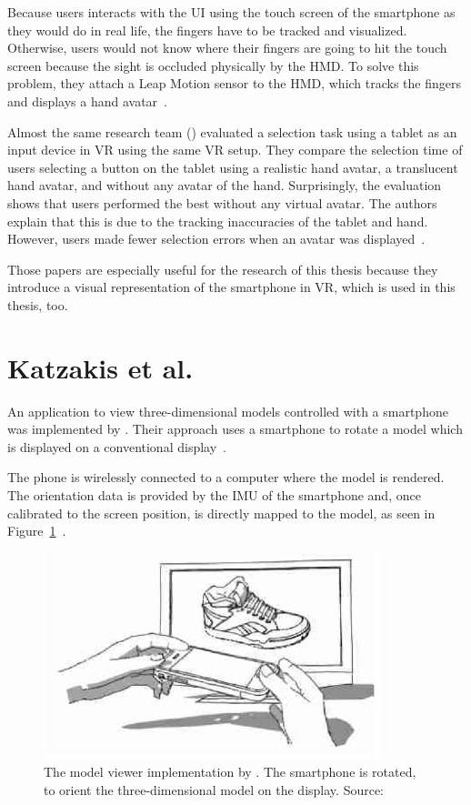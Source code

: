 Because users interacts with the \gls{UI} using the touch screen of the smartphone as they would do in real life, the fingers have to be tracked and visualized. Otherwise, users would not know where their fingers are going to hit the touch screen because the sight is occluded physically by the \gls{HMD}. To solve this problem, they attach a Leap Motion sensor to the \gls{HMD}, which tracks the fingers and displays a hand avatar~\cite{Dias.2018}.

Almost the same research team (\citeauthor{Afonso.2017}) evaluated a selection task using a tablet as an input device in \gls{VR} using the same \gls{VR} setup. They compare the selection time of users selecting a button on the tablet using a realistic hand avatar, a translucent hand avatar, and without any avatar of the hand. Surprisingly, the evaluation shows that users performed the best without any virtual avatar. The authors explain that this is due to the tracking inaccuracies of the tablet and hand. However, users made fewer selection errors when an avatar was displayed~\cite[247-248]{Afonso.2017}.

Those papers are especially useful for the research of this thesis because they introduce a visual representation of the smartphone in \gls{VR}, which is used in this thesis, too. 


\section{Katzakis et al.}\label{section:katzakis-2010}
An application to view three-dimensional models controlled with a smartphone was implemented by \citeauthor{Katzakis.2010}. Their approach uses a smartphone to rotate a model which is displayed on a conventional display~\cite[139]{Katzakis.2010}. 

The phone is wirelessly connected to a computer where the model is rendered. The orientation data is provided by the \gls{IMU} of the smartphone and, once calibrated to the screen position, is directly mapped to the model, as seen in Figure~\ref{fig:katzakis-2010}~\cite[139]{Katzakis.2010}. 

\begin{figure}[H]%
  \centering%
  \includegraphics[height=6cm]{figures/related_work/katzakis_2010_3d_object.png}%
  \caption[Model viewer implementation by Katzakis et al.]{
  The model viewer implementation by \citeauthor{Katzakis.2010}. The smartphone is rotated, to orient the three-dimensional model on the display.
  \newline{}
  Source:~\cite[Figure 1]{Katzakis.2010}}\label{fig:katzakis-2010}
\end{figure}

